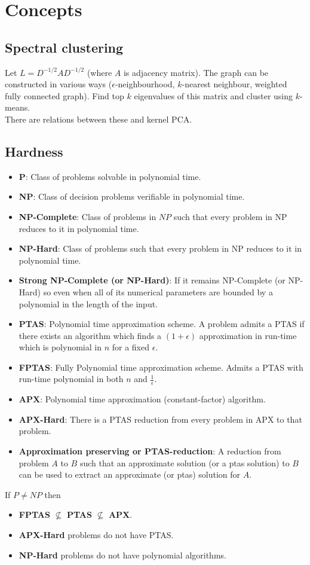 \documentclass[12pt]{article}
\begin{document}
\section{Concepts}
\subsection{Spectral clustering}
Let $L = D^{-1/2} A D^{-1/2}$ (where $A$ is adjacency matrix). The graph can be constructed in various ways ($\epsilon$-neighbourhood, $k$-nearest neighbour, weighted fully connected graph). Find top $k$ eigenvalues of this matrix and cluster using $k$-means.\\
	There are relations between these and kernel PCA.
\subsection{Hardness}
\begin{itemize}
	\item \textbf{P}: Class of problems solvable in polynomial time.
	\item \textbf{NP}: Class of decision problems verifiable in polynomial time.
	\item \textbf{NP-Complete}: Class of problems in $NP$ such that every problem in NP reduces to it in polynomial time. 
	\item \textbf{NP-Hard}: Class of problems such that every problem in NP reduces to it in polynomial time. 
	\item \textbf{Strong NP-Complete (or NP-Hard)}: If it remains NP-Complete (or NP-Hard) so even when all of its numerical parameters are bounded by a polynomial in the length of the input.
	\item \textbf{PTAS}: Polynomial time approximation scheme. A problem admits a PTAS if there exists an algorithm which finds a $(1+\epsilon)$ approximation in run-time which is polynomial in $n$ for a fixed $\epsilon$. 
	\item \textbf{FPTAS}: Fully Polynomial time approximation scheme. Admits a PTAS with run-time polynomial in both $n$ and $\frac{1}{\epsilon}$. 
	\item \textbf{APX}: Polynomial time approximation (constant-factor) algorithm.
	\item \textbf{APX-Hard}: There is a PTAS reduction from every problem in APX to that problem.
	\item \textbf{Approximation preserving or PTAS-reduction}: A reduction from problem $A$ to $B$ such that an approximate solution (or a ptas solution) to $B$ can be used to extract an approximate (or ptas) solution for $A$.
\end{itemize}
If $P \neq NP$ then
\begin{itemize}
	\item \textbf{FPTAS} $\not\subseteq$ \textbf{PTAS} $\not\subseteq$ \textbf{APX}.
	\item \textbf{APX-Hard} problems do not have PTAS. 
	\item \textbf{NP-Hard} problems do not have polynomial algorithms. 
\end{itemize}
\end{document}
